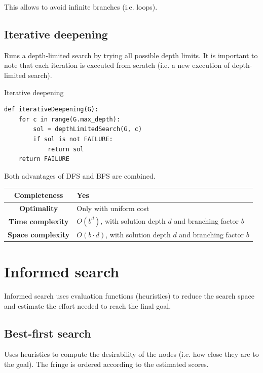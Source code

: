 This allows to avoid infinite branches (i.e. loops).



\subsection{Iterative deepening}
Runs a depth-limited search by trying all possible depth limits.
It is important to note that each iteration is executed from scratch (i.e. a new execution of depth-limited search).

\begin{algorithm}
\caption{Iterative deepening}
\begin{lstlisting}
def iterativeDeepening(G):
    for c in range(G.max_depth):
        sol = depthLimitedSearch(G, c)
        if sol is not FAILURE:
            return sol
    return FAILURE
\end{lstlisting}
\end{algorithm}

Both advantages of DFS and BFS are combined.

\begin{center}
    \def\arraystretch{1.2}
    \begin{tabular}{c | m{10cm}}
        \hline
        \textbf{Completeness} & Yes \\
        \hline
        \textbf{Optimality} & Only with uniform cost \\
        \hline
        \textbf{Time complexity}
            & $O(b^d)$, with solution depth $d$ and branching factor $b$ \\
        \hline
        \textbf{Space complexity}
            & $O(b \cdot d)$, with solution depth $d$ and branching factor $b$ \\
        \hline
    \end{tabular}
\end{center}



\section{Informed search}
Informed search uses evaluation functions (heuristics) to reduce the search space and
estimate the effort needed to reach the final goal.


\subsection{Best-first search}
Uses heuristics to compute the desirability of the nodes (i.e. how close they are to the goal).
The fringe is ordered according to the estimated scores.


